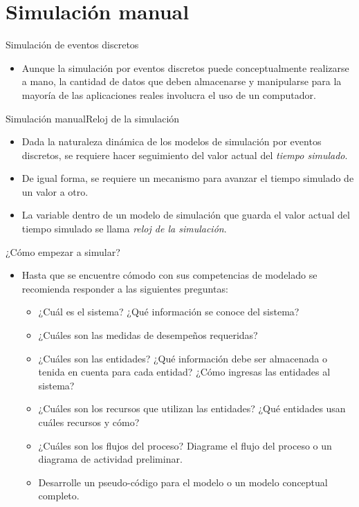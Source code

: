 \section{Simulación manual}

\begin{frame}{Simulación de eventos discretos}
    \begin{itemize}
        \item Aunque la simulación por eventos discretos puede conceptualmente realizarse a mano, la cantidad de datos que deben almacenarse y manipularse para la mayoría de las aplicaciones reales involucra el uso de un computador.
    \end{itemize}
\end{frame}

\begin{frame}{Simulación manual}{Reloj de la simulación}
    \begin{itemize}
        \item Dada la naturaleza dinámica de los modelos de simulación por eventos discretos, se requiere hacer seguimiento del valor actual del \textit{tiempo simulado}.
        \item De igual forma, se requiere un mecanismo para avanzar el tiempo simulado de un valor a otro.
        \item La variable dentro de un modelo de simulación que guarda el valor actual del tiempo simulado se llama \textit{reloj de la simulación}.
    \end{itemize}
\end{frame}

\begin{frame}{¿Cómo empezar a simular?}
    \begin{itemize}
        \item Hasta que se encuentre cómodo con sus competencias de modelado se recomienda responder a las siguientes preguntas:
        \begin{itemize}
            \item ¿Cuál es el sistema? ¿Qué información se conoce del sistema?
            \item ¿Cuáles son las medidas de desempeños requeridas?
            \item ¿Cuáles son las entidades? ¿Qué información debe ser almacenada o tenida en cuenta para cada entidad? ¿Cómo ingresas las entidades al sistema?
            \item ¿Cuáles son los recursos que utilizan las entidades? ¿Qué entidades usan cuáles recursos y cómo?
            \item ¿Cuáles son los flujos del proceso? Diagrame el flujo del proceso o un diagrama de actividad preliminar.
            \item Desarrolle un pseudo-código para el modelo o un modelo conceptual completo.
        \end{itemize}
    \end{itemize}
\end{frame}

